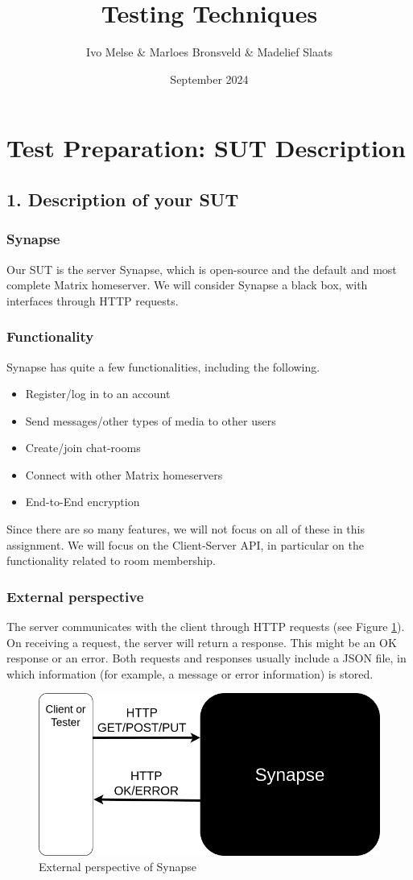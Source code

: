 \documentclass{article}
\title{Testing Techniques}
\author{Ivo Melse \& Marloes Bronsveld \& Madelief Slaats}
\date{September 2024}
\begin{document}
\small
\maketitle

\section*{Test Preparation: SUT Description}
\subsection*{1. Description of your SUT}
\subsubsection*{Synapse}
Our SUT is the server Synapse, which is open-source and the default and most complete Matrix homeserver. We will consider Synapse a black box, with interfaces through HTTP requests.

\subsubsection*{Functionality}
Synapse has quite a few functionalities, including the following.
\begin{itemize}
    \item Register/log in to an account
    \item Send messages/other types of media to other users
    \item Create/join chat-rooms 
    \item Connect with other Matrix homeservers
    \item End-to-End encryption
\end{itemize}
Since there are so many features, we will not focus on all of these in this assignment. We will focus on the Client-Server API, in particular on the functionality related to room membership.

\subsubsection*{External perspective}
The server communicates with the client through HTTP requests (see Figure \ref{fig:ext-per}). On receiving a request, the server will return a response. This might be an OK response or an error. Both requests and responses usually include a JSON file, in which information (for example, a message or error information) is stored.
\begin{figure}[h]
    \centering
    \includegraphics[width=0.5\linewidth]{External_perspective.drawio.png}
    \caption{External perspective of Synapse}
    \label{fig:ext-per}
\end{figure}
\end{document}
